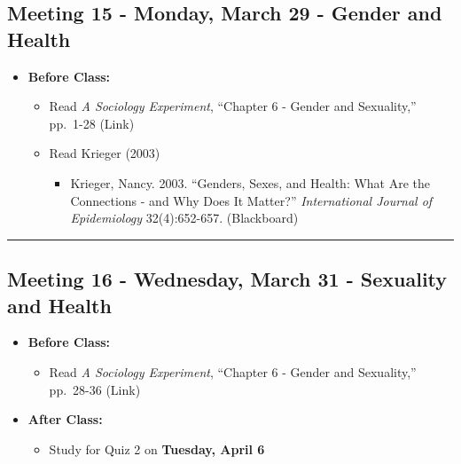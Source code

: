 \documentclass[
]{book}
\providecommand{\tightlist}{%
  \setlength{\itemsep}{0pt}\setlength{\parskip}{0pt}}
\begin{document}
\hypertarget{meeting-15---monday-march-29---gender-and-health}{%
\subsection*{Meeting 15 - Monday, March 29 - Gender and Health}\label{meeting-15---monday-march-29---gender-and-health}}

\begin{itemize}
\tightlist
\item
  \textbf{Before Class:}

  \begin{itemize}
  \tightlist
  \item
    Read \emph{A Sociology Experiment}, ``Chapter 6 - Gender and Sexuality,'' pp.~1-28 (Link)
  \item
    Read Krieger (2003)

    \begin{itemize}
    \tightlist
    \item
      Krieger, Nancy. 2003. ``Genders, Sexes, and Health: What Are the Connections - and Why Does It Matter?'' \emph{International Journal of Epidemiology} 32(4):652-657. (Blackboard)
    \end{itemize}
  \end{itemize}
\end{itemize}

\begin{center}\rule{0.5\linewidth}{0.5pt}\end{center}

\hypertarget{meeting-16---wednesday-march-31---sexuality-and-health}{%
\subsection*{Meeting 16 - Wednesday, March 31 - Sexuality and Health}\label{meeting-16---wednesday-march-31---sexuality-and-health}}

\begin{itemize}
\tightlist
\item
  \textbf{Before Class:}

  \begin{itemize}
  \tightlist
  \item
    Read \emph{A Sociology Experiment}, ``Chapter 6 - Gender and Sexuality,'' pp.~28-36 (Link)
  \end{itemize}
\item
  \textbf{After Class:}

  \begin{itemize}
  \tightlist
  \item
    Study for Quiz 2 on \textbf{Tuesday, April 6}
  \end{itemize}
\end{itemize}
\end{document}
